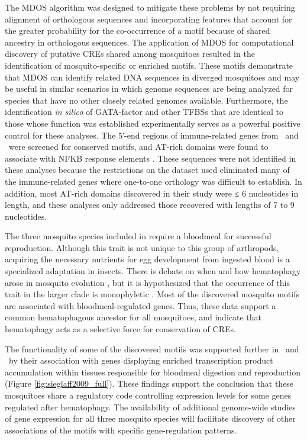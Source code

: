 The \gls{MDOS} algorithm \cite{Wu2008} was designed to mitigate these problems by not requiring alignment of orthologous sequences and incorporating features that account for the greater probability for the co-occurrence of a motif because of shared ancestry in orthologous sequences. The application of \gls{MDOS} for computational discovery of putative \glspl{CRE} shared among mosquitoes resulted in the identification of mosquito-specific or enriched motifs. These motifs demonstrate that \gls{MDOS} can identify related DNA sequences in diverged mosquitoes and may be useful in similar scenarios in which genome sequences are being analyzed for species that have no other closely related genomes available. Furthermore, the identification \textit{in silico} of GATA-factor and other \glspl{TFBS} that are identical to those whose function was established experimentally \cite{Kokoza2001,Cho2006,Attardo2003,Ahmed1999,Pham2005,Giannoni2001,Dittmer2003,Meredith2006} serves as a powerful positive control for these analyses. The 5′-end regions of immune-related genes from \Ag\ and \Dm\ were screened for conserved motifs, and AT-rich domains were found to associate with \gls{NFKB} response elements \cite{Hernandez-Romano2008}. These sequences were not identified in these analyses because the restrictions on the dataset used eliminated many of the immune-related genes where one-to-one orthology was difficult to establish. In addition, most AT-rich domains discovered in their study were ≤ 6 nucleotides in length, and these analyses only addressed those recovered with lengths of 7 to 9 nucleotides.

The three mosquito species included in \citet{Sieglaff2009} require a bloodmeal for successful reproduction. Although this trait is not unique to this group of arthropods, acquiring the necessary nutrients for egg development from ingested blood is a specialized adaptation in insects. There is debate on when and how \gls{hematophagy} arose in mosquito evolution \cite{Rai1999a}, but it is hypothesized that the occurrence of this trait in the larger clade is \gls{monophyletic} \cite{Borkent2004,Calvo2006}. Most of the discovered mosquito motifs are associated with bloodmeal-regulated genes. Thus, these data support a common hematophagous ancestor for all mosquitoes, and indicate that \gls{hematophagy} acts as a selective force for conservation of \glspl{CRE}.

The functionality of some of the discovered motifs was supported further in \Ag\ and \Aa\ by their association with genes displaying enriched transcription product accumulation within tissues responsible for bloodmeal digestion and reproduction (Figure \ref{fig:sieglaff2009_full}). These findings support the conclusion that these mosquitoes share a regulatory code controlling expression levels for some genes regulated after \gls{hematophagy}. The availability of additional genome-wide studies of gene expression for all three mosquito species will facilitate discovery of other associations of the motifs with specific gene-regulation patterns.

